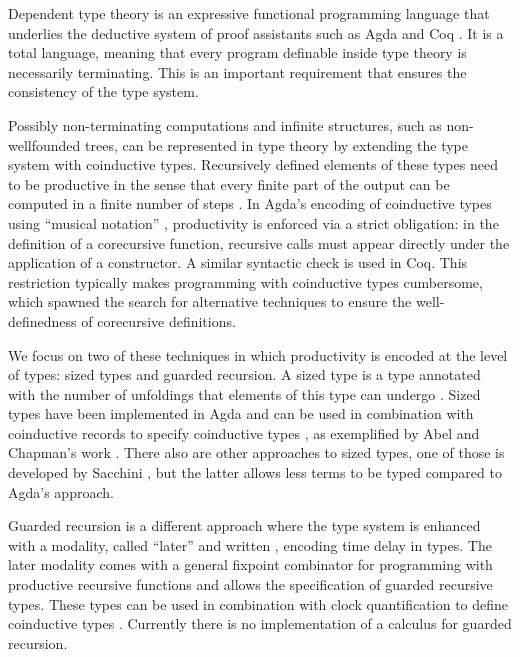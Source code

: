 Dependent type theory is an expressive functional programming
language that underlies the deductive system of proof assistants such
as Agda \cite{norell} and Coq \cite{barras1997coq}. It is a total language,
meaning that every program definable inside type theory is necessarily
terminating. This is an important requirement that ensures the
consistency of the type system. 

Possibly non-terminating computations
and infinite structures, such as non-wellfounded trees, can be
represented in type theory by extending the type system with
coinductive types. Recursively defined elements of these types
need to be productive in the sense that every
finite part of the output can be computed in a finite number of steps \cite{Coquand93}.
In Agda's encoding of coinductive types using ``musical notation''
\cite{DA10}, productivity is enforced via a strict obligation: in the
definition of a corecursive function, recursive
calls must appear directly under
the application of a constructor. A similar syntactic
check is used in Coq. %
This restriction
typically makes programming with coinductive types cumbersome,
which spawned the search for alternative techniques to ensure the
well-definedness of corecursive definitions.

We focus on two of these techniques in which productivity is encoded
at the level of types: sized types and guarded recursion. A sized type
 is a type annotated with the number of unfoldings that
elements of this type can undergo \cite{Hughes96}. Sized types have been implemented
in Agda and can be used in
combination with coinductive records to specify
coinductive types \cite{Copatterns,AVW-normalization}, as exemplified
by Abel and Chapman's work \cite{AC14}.
There also are other approaches to sized types, one of those is developed by Sacchini
\cite{Sacchini13}, but the latter allows less terms to be typed
compared to Agda's approach.

Guarded recursion \cite{Nakano}
is a different approach where the type system is enhanced with a
modality, called ``later'' and written , encoding time delay in
types. The later modality comes with a general fixpoint combinator for
programming with productive recursive functions and allows the
specification of guarded recursive types.
These types can be used in combination with clock quantification to define  coinductive types \cite{atkey2013productive,BahrGM17,bizjak2016guarded}. Currently there is no
implementation of a calculus for guarded recursion.

